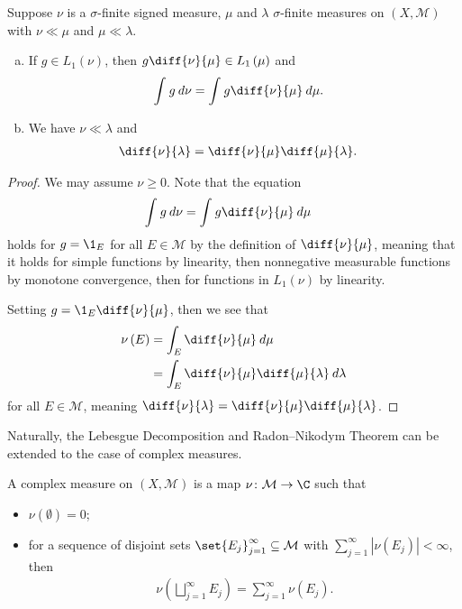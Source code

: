 \documentclass[10pt]{mypackage}
\begin{document}
\begin{proposition}
  Suppose $\nu$ is a $\sigma$-finite signed measure, $\mu$ and $\lambda$ $\sigma$-finite measures on $\left( X,\mathcal{M} \right)$ with $\nu\ll\mu$ and $\mu\ll\lambda$.
  \begin{enumerate}[(a)]
    \item If $g\in L_1\left( \nu \right)$, then $g \diff{\nu}{\mu} \in L_1\left( \mu \right)$ and
      \begin{align*}
        \int_{}^{} g\:d\nu &= \int_{}^{} g\diff{\nu}{\mu}\:d\mu.
      \end{align*}
    \item We have $\nu\ll\lambda$ and
      \begin{align*}
        \diff{\nu}{\lambda} &= \diff{\nu}{\mu}\diff{\mu}{\lambda}.
      \end{align*}
  \end{enumerate}
\end{proposition}
\begin{proof}
  We may assume $\nu \geq 0$. Note that the equation
  \begin{align*}
    \int_{}^{} g\:d\nu &= \int_{}^{} g\diff{\nu}{\mu}\:d\mu
  \end{align*}
  holds for $g = \1_{E}$ for all $E\in \mathcal{M}$ by the definition of $\diff{\nu}{\mu}$, meaning that it holds for simple functions by linearity, then nonnegative measurable functions by monotone convergence, then for functions in $L_1\left( \nu \right)$ by linearity.\newline

  Setting $g = \1_{E}\diff{\nu}{\mu}$, then we see that
  \begin{align*}
    \nu\left( E \right) &= \int_{E}^{} \diff{\nu}{\mu}\:d\mu\\
                        &= \int_{E}^{} \diff{\nu}{\mu}\diff{\mu}{\lambda}\:d\lambda
  \end{align*}
  for all $E\in \mathcal{M}$, meaning $\diff{\nu}{\lambda} = \diff{\nu}{\mu}\diff{\mu}{\lambda}$.
\end{proof}
Naturally, the Lebesgue Decomposition and Radon--Nikodym Theorem can be extended to the case of complex measures.
\begin{definition}
  A complex measure on $\left( X,\mathcal{M} \right)$ is a map $\nu\colon \mathcal{M}\rightarrow \C$ such that
  \begin{itemize}
    \item $\nu\left( \emptyset \right) = 0$;
    \item for a sequence of disjoint sets $\set{E_j}_{j=1}^{\infty}\subseteq \mathcal{M}$ with $\sum_{j=1}^{\infty}\left\vert \nu\left( E_j \right) \right\vert < \infty$, then 
      \begin{align*}
        \nu\left( \bigsqcup_{j=1}^{\infty}E_j \right) = \sum_{j=1}^{\infty}\nu\left( E_j \right).
      \end{align*}
  \end{itemize}
\end{definition}
\end{document}
